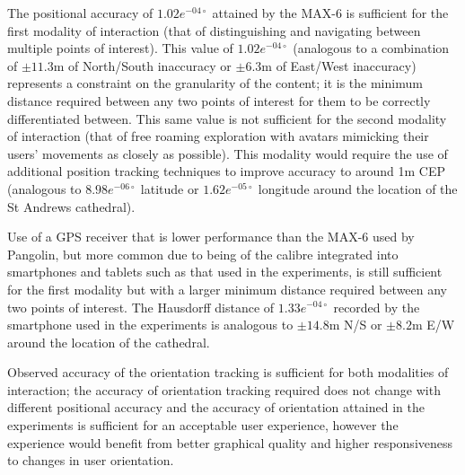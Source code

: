 The positional accuracy of $1.02e^{-04\circ}$ attained by the MAX-6 is sufficient for the first modality of interaction (that of distinguishing and navigating between multiple points of interest). This value of $1.02e^{-04\circ}$ (analogous to a combination of $\pm11.3$m of North/South inaccuracy or $\pm6.3$m of East/West inaccuracy) represents a constraint on the granularity of the content; it is the minimum distance required between any two points of interest for them to be correctly differentiated between. This same value is not sufficient for the second modality of interaction (that of free roaming exploration with avatars mimicking their users' movements as closely as possible). This modality would require the use of additional position tracking techniques to improve accuracy to around 1m CEP (analogous to $8.98e^{-06\circ}$ latitude or $1.62e^{-05\circ}$ longitude around the location of the St Andrews cathedral).

Use of a GPS receiver that is lower performance than the MAX-6 used by Pangolin, but more common due to being of the calibre integrated into smartphones and tablets such as that used in the experiments, is still sufficient for the first modality but with a larger minimum distance required between any two points of interest. The Hausdorff distance of $1.33e^{-04\circ}$ recorded by the smartphone used in the experiments is analogous to $\pm14.8$m N/S or $\pm8.2$m E/W around the location of the cathedral.

Observed accuracy of the orientation tracking is sufficient for both modalities of interaction; the accuracy of orientation tracking required does not change with different positional accuracy and the accuracy of orientation attained in the experiments is sufficient for an acceptable user experience, however the experience would benefit from better graphical quality and higher responsiveness to changes in user orientation.

